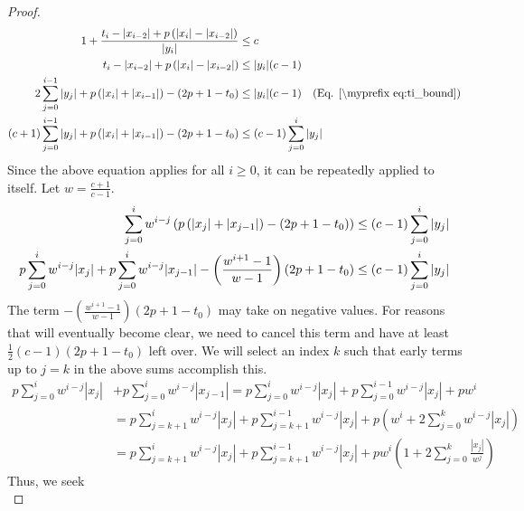 \begin{appendixonly}
\begin{proof}
  \begin{align*}
    1 + \frac{t_i-|x_{i-2}| + p\left(|x_i|-|x_{i-2}|\right)}{|y_i|} &\leq c \\
    t_i-|x_{i-2}| + p\left(|x_i|-|x_{i-2}|\right) &\leq |y_i|(c-1) \\
    2\sum_{j=0}^{i-1}|y_j| + p\left(|x_i|+|x_{i-1}|\right) - (2p+1-t_0) &\leq |y_i|(c-1) \quad\text{(Eq. \myeqref{eq:ti_bound})}\\
    (c+1)\sum_{j=0}^{i-1}|y_j| + p\left(|x_i|+|x_{i-1}|\right) - (2p+1-t_0) &\leq (c-1)\sum_{j=0}^{i}|y_j|
  \end{align*}
  Since the above equation applies for all $i\geq 0$, it can be repeatedly applied to itself.
  Let $w=\frac{c+1}{c-1}$.
  \begin{align}
    \sum_{j=0}^{i}w^{i-j}\left(p\left(|x_j|+|x_{j-1}|\right) - (2p+1-t_0)\right) &\leq (c-1)\sum_{j=0}^{i}|y_j| \nonumber\\
    p\sum_{j=0}^{i}w^{i-j}|x_j| + p\sum_{j=0}^{i}w^{i-j}|x_{j-1}| - \left(\frac{w^{i+1}-1}{w-1}\right)(2p+1-t_0) &\leq (c-1)\sum_{j=0}^{i}|y_j| \mylabel{eq:bad_neg_term}
  \end{align}
  The term $-\left(\frac{w^{i+1}-1}{w-1}\right)(2p+1-t_0)$ may take on negative values. For reasons that will eventually become clear, we need to cancel this term and have at least $\frac12(c-1)(2p+1-t_0)$ left over. We will select an index $k$ such that early terms up to $j=k$ in the above sums accomplish this.
  \begin{align*}
    p\sum_{j=0}^{i}w^{i-j}|x_j| &+ p\sum_{j=0}^{i}w^{i-j}|x_{j-1}|
    = p\sum_{j=0}^{i}w^{i-j}|x_j| + p\sum_{j=0}^{i-1}w^{i-j}|x_j| + pw^i \\
    &= p\sum_{j=k+1}^{i}w^{i-j}|x_j| + p\sum_{j=k+1}^{i-1}w^{i-j}|x_j| + p\left(w^i + 2\sum_{j=0}^{k}w^{i-j}|x_j|\right) \\
    &= p\sum_{j=k+1}^{i}w^{i-j}|x_j| + p\sum_{j=k+1}^{i-1}w^{i-j}|x_j| + pw^i\left(1 + 2\sum_{j=0}^{k}\frac{|x_j|}{w^j}\right)
  \end{align*}
  Thus, we seek
  \begin{equation*}

\end{equation*}
\end{proof}
\end{appendixonly}

